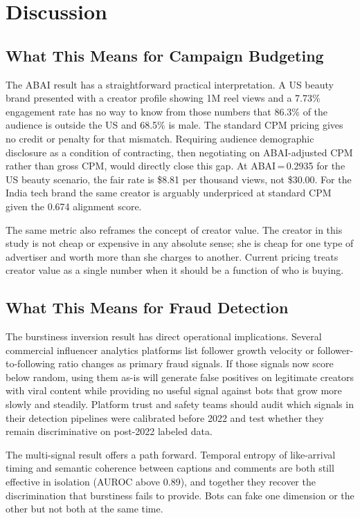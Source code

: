 \documentclass[conference]{IEEEtran}
\begin{document}
\section{Discussion}

\subsection{What This Means for Campaign Budgeting}

The ABAI result has a straightforward practical interpretation. A US
beauty brand presented with a creator profile showing 1M reel views and
a 7.73\% engagement rate has no way to know from those numbers that 86.3\%
of the audience is outside the US and 68.5\% is male. The standard CPM
pricing gives no credit or penalty for that mismatch. Requiring audience
demographic disclosure as a condition of contracting, then negotiating on
ABAI-adjusted CPM rather than gross CPM, would directly close this gap.
At ABAI\,=\,0.2935 for the US beauty scenario, the fair rate is \$8.81
per thousand views, not \$30.00. For the India tech brand the same creator
is arguably underpriced at standard CPM given the 0.674 alignment score.

The same metric also reframes the concept of creator value. The creator
in this study is not cheap or expensive in any absolute sense; she is
cheap for one type of advertiser and worth more than she charges to another.
Current pricing treats creator value as a single number when it should be
a function of who is buying.

\subsection{What This Means for Fraud Detection}

The burstiness inversion result has direct operational implications. Several
commercial influencer analytics platforms list follower growth velocity or
follower-to-following ratio changes as primary fraud signals. If those
signals now score below random, using them as-is will generate false
positives on legitimate creators with viral content while providing no
useful signal against bots that grow more slowly and steadily. Platform
trust and safety teams should audit which signals in their detection
pipelines were calibrated before 2022 and test whether they remain
discriminative on post-2022 labeled data.

The multi-signal result offers a path forward. Temporal entropy of
like-arrival timing and semantic coherence between captions and comments
are both still effective in isolation (AUROC above 0.89), and together they
recover the discrimination that burstiness fails to provide. Bots can fake
one dimension or the other but not both at the same time.
\end{document}
